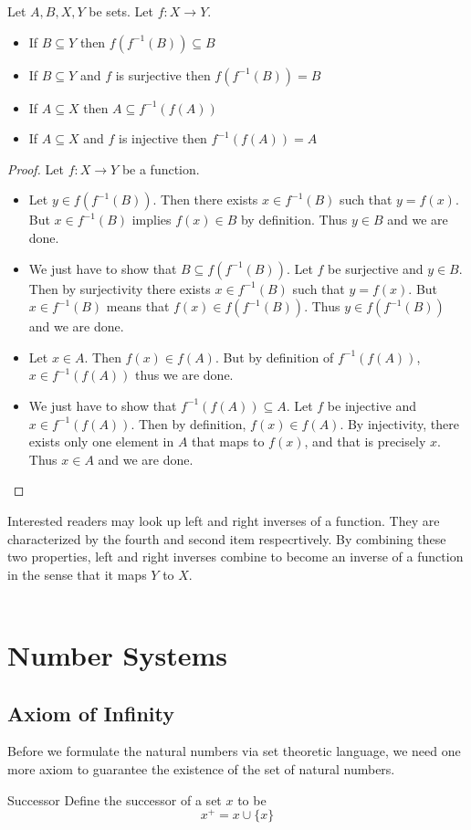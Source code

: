 \documentclass[a4paper]{article}
\begin{document}
\begin{prp}{}{} Let $A,B,X,Y$ be sets. Let $f:X\to Y$. 
\begin{itemize}
\item If $B\subseteq Y$ then $f(f^{-1}(B))\subseteq B$
\item If $B\subseteq Y$ and $f$ is surjective then $f(f^{-1}(B))=B$
\item If $A\subseteq X$ then $A\subseteq f^{-1}(f(A))$
\item If $A\subseteq X$ and $f$ is injective then $f^{-1}(f(A))=A$
\end{itemize} \tcbline
\begin{proof}
Let $f:X\to Y$ be a function. 
\begin{itemize}
\item Let $y\in f(f^{-1}(B))$. Then there exists $x\in f^{-1}(B)$ such that $y=f(x)$. But $x\in f^{-1}(B)$ implies $f(x)\in B$ by definition. Thus $y\in B$ and we are done. 
\item We just have to show that $B\subseteq f(f^{-1}(B))$. Let $f$ be surjective and $y\in B$. Then by surjectivity there exists $x\in f^{-1}(B)$ such that $y=f(x)$. But $x\in f^{-1}(B)$ means that $f(x)\in f(f^{-1}(B))$. Thus $y\in f(f^{-1}(B))$ and we are done. 
\item Let $x\in A$. Then $f(x)\in f(A)$. But by definition of $f^{-1}(f(A))$, $x\in f^{-1}(f(A))$ thus we are done. 
\item We just have to show that $f^{-1}(f(A))\subseteq A$. Let $f$ be injective and $x\in f^{-1}(f(A))$. Then by definition, $f(x)\in f(A)$. By injectivity, there exists only one element in $A$ that maps to $f(x)$, and that is precisely $x$. Thus $x\in A$ and we are done. 
\end{itemize}
\end{proof}
\end{prp}

Interested readers may look up left and right inverses of a function. They are characterized by the fourth and second item respecrtively. By combining these two properties, left and right inverses combine to become an inverse of a function in the sense that it maps $Y$ to $X$. \\~\\

\pagebreak

\section{Number Systems}
\subsection{Axiom of Infinity}
Before we formulate the natural numbers via set theoretic language, we need one more axiom to guarantee the existence of the set of natural numbers. 
\begin{defn}{Successor}{} Define the successor of a set $x$ to be $$x^+=x\cup\{x\}$$
\end{defn}
\end{document}
